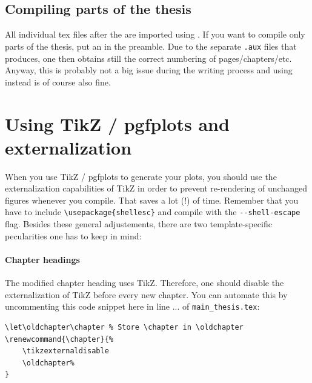 \subsection{Compiling parts of the thesis}
All individual tex files after the \verb|| are imported using \verb||. If you want to compile only parts of the thesis, put an \verb|| in the preamble. Due to the separate \verb|.aux| files that \verb|| produces, one then obtains still the correct numbering of pages/chapters/etc. Anyway, this is probably not a big issue during the writing process and using \verb|| instead is of course also fine.

\section{Using TikZ / pgfplots and externalization}
When you use TikZ / pgfplots to generate your plots, you should use the externalization capabilities of TikZ in order to prevent re-rendering of unchanged figures whenever you compile. That saves a lot (!) of time. 
Remember that you have to include \verb|\usepackage{shellesc}| and compile with the \verb|--shell-escape| flag. Besides these general adjustements, there are two template-specific pecularities one has to keep in mind: 

\paragraph{Chapter headings} The modified chapter heading uses TikZ. Therefore, one should disable the externalization of TikZ before every new chapter. You can automate this by uncommenting this code snippet here in line ... of \verb|main_thesis.tex|:
\begin{lstlisting}
\let\oldchapter\chapter	% Store \chapter in \oldchapter
\renewcommand{\chapter}{%
	\tikzexternaldisable
	\oldchapter%
}
\end{lstlisting}

